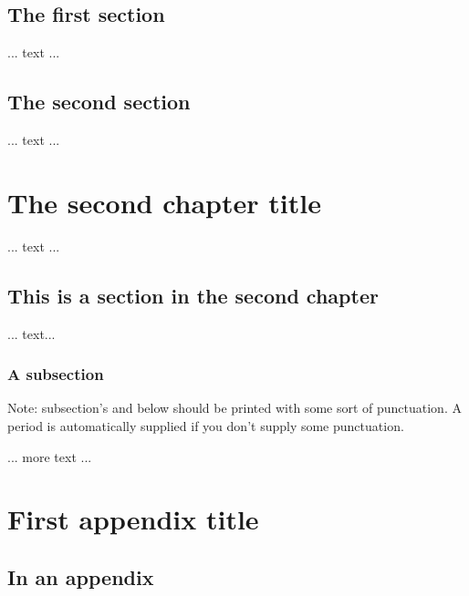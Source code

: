 \documentclass[11pt]{afthesis}
\begin{document}
\section{The first section}     %
    ... text ...        %
\section{The second section}    %
    ... text ...        %

\chapter{The second chapter title} %

    ... text ...

\section{This is a section in the second chapter}

    ... text...

\subsection{A subsection}

Note: subsection's and below should be
printed with some sort of punctuation.
A period is automatically supplied if you
don't supply some punctuation.

    ... more text ...



\appendix       %

\chapter{First appendix title}

\section{In an appendix}
\end{document}
